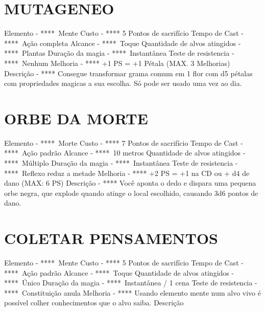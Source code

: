 \documentclass{article}%
\begin{document}
\section{MUTAGENEO}%
\label{sec:MUTAGENEO}%
Elemento {-} ****~Mente\newline%
Custo {-} **** 5 Pontos de sacrifício\newline%
Tempo de Cast {-} ****~Ação completa\newline%
Alcance {-} ****~Toque\newline%
Quantidade de alvos atingidos {-} ****~Plantas\newline%
Duração da magia {-} ****~Instantânea\newline%
Teste de resistencia {-} ****~Nenhum\newline%
Melhoria {-} **** +1 PS = +1 Pétala (MAX. 3 Melhorias)\newline%
Descrição {-} **** Consegue transformar grama comum em 1 flor com d5 pétalas com propriedades magicas a sua escolha. Só pode ser usado uma vez ao dia.\newline%

%
\section{ORBE DA MORTE}%
\label{sec:ORBEDAMORTE}%
Elemento {-} ****~Morte\newline%
Custo {-} **** 7 Pontos de sacrifício\newline%
Tempo de Cast {-} ****~Ação padrão\newline%
Alcance {-} ****~10 metros\newline%
Quantidade de alvos atingidos {-} ****~Múltiplo\newline%
Duração da magia {-} ****~Instantânea\newline%
Teste de resistencia {-} ****~Reflexo reduz a metade\newline%
Melhoria {-} **** +2 PS = +1 na CD ou + d4 de dano (MAX: 6 PS)\newline%
Descrição {-} **** Você aponta o dedo e dispara uma pequena orbe negra, que explode quando atinge o local escolhido, causando 3d6 pontos de dano.\newline%

%
\section{COLETAR PENSAMENTOS}%
\label{sec:COLETARPENSAMENTOS}%
Elemento {-} ****~Mente\newline%
Custo {-} **** 5 Pontos de sacrifício\newline%
Tempo de Cast {-} ****~Ação padrão\newline%
Alcance {-} ****~Toque\newline%
Quantidade de alvos atingidos {-} ****~Único\newline%
Duração da magia {-} ****~Instantânea / 1 cena\newline%
Teste de resistencia {-} ****~Constituição anula\newline%
Melhoria {-} **** Usando elemento mente num alvo vivo é possível colher conhecimentos que o alvo saiba.\newline%
Descrição \newline%
\end{document}
